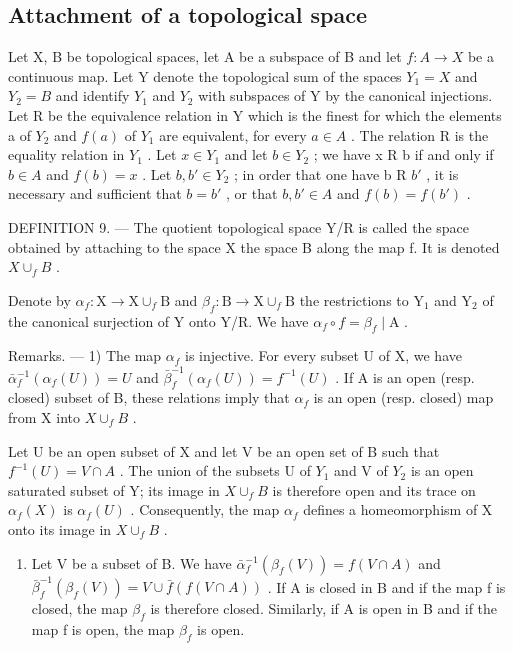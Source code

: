 \subsection{Attachment of a topological space}

Let X, B be topological spaces, let A be a subspace of B and let \(f: A \rightarrow X\) be a continuous map. Let Y denote the topological sum of the spaces \(Y_{1} = X\) and \(Y_{2} = B\) and identify \(Y_{1}\) and \(Y_{2}\) with subspaces of Y by the canonical injections. Let R be the equivalence relation in Y which is the finest for which the elements a of \(Y_{2}\) and \(f(a)\) of \(Y_{1}\) are equivalent, for every \(a \in A\) . The relation R is the equality relation in \(Y_{1}\) . Let \(x \in Y_{1}\) and let \(b \in Y_{2}\) ; we have x R b if and only if \(b \in A\) and \(f(b) = x\) . Let \(b, b' \in Y_{2}\) ; in order that one have b R \(b'\) , it is necessary and sufficient that \(b = b'\) , or that \(b, b' \in A\) and \(f(b) = f(b')\) .

DEFINITION 9. --- The quotient topological space Y/R is called the space obtained by attaching to the space X the space B along the map f. It is denoted \(X \cup_{f} B\) .

Denote by \(\alpha_{f}\colon\mathrm{X}\to\mathrm{X}\cup_{f}\mathrm{B}\) and \(\beta_{f}\colon\mathrm{B}\to\mathrm{X}\cup_{f}\mathrm{B}\) the restrictions to \(\mathrm{Y}_{1}\) and \(\mathrm{Y}_{2}\) of the canonical surjection of Y onto Y/R. We have \(\alpha_{f}\circ f=\beta_{f}\mid\mathrm{A}\) .

Remarks. --- 1) The map \(\alpha_{f}\) is injective. For every subset U of X, we have \(\bar{\alpha}_{f}^{-1}(\alpha_{f}(U)) = U\) and \(\bar{\beta}_{f}^{-1}(\alpha_{f}(U)) = f^{-1}(U)\) . If A is an open (resp. closed) subset of B, these relations imply that \(\alpha_{f}\) is an open (resp. closed) map from X into \(X \cup_{f} B\) .

Let U be an open subset of X and let V be an open set of B such that \(f^{-1}(U) = V \cap A\) . The union of the subsets U of \(Y_{1}\) and V of \(Y_{2}\) is an open saturated subset of Y; its image in \(X \cup_{f} B\) is therefore open and its trace on \(\alpha_{f}(X)\) is \(\alpha_{f}(U)\) . Consequently, the map \(\alpha_{f}\) defines a homeomorphism of X onto its image in \(X \cup_{f} B\) .

\begin{enumerate}
\def\labelenumi{\arabic{enumi})}
\setcounter{enumi}{1}
\tightlist
\item
  Let V be a subset of B. We have \(\bar{\alpha}_{f}^{-1}(\beta_{f}(V)) = f(V \cap A)\) and \(\bar{\beta}_{f}^{-1}(\beta_{f}(V)) = V \cup \bar{f}(f(V \cap A))\) . If A is closed in B and if the map f is closed, the map \(\beta_{f}\) is therefore closed. Similarly, if A is open in B and if the map f is open, the map \(\beta_{f}\) is open.
\end{enumerate}

